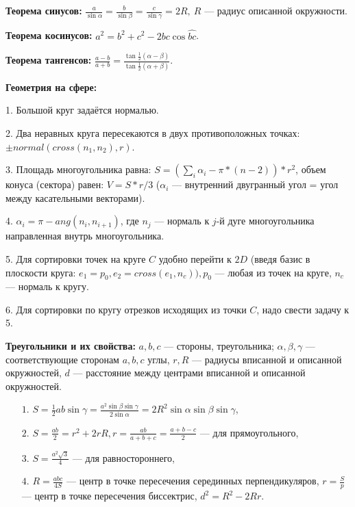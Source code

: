 \textbf{Теорема синусов:} $\frac{a}{\sin\alpha}=\frac{b}{\sin\beta}=\frac{c}{\sin\gamma}=2R,\ R$ --- радиус описанной окружности.

\textbf{Теорема косинусов:} $\displaystyle a^2 = b^2 + c^2 - 2bc\cos{\widehat{bc}}$.

\textbf{Теорема тангенсов:} $\displaystyle \frac{a-b}{a+b}=\frac{\tan\frac{1}{2}(\alpha -\beta)}{\tan\frac{1}{2}(\alpha +\beta)}$.

\textbf{Геометрия на сфере:}

1. Большой круг задаётся нормалью.

2. Два неравных круга пересекаются в двух противоположных точках: $\pm normal(cross(n_1, n_2), r)$.

3. Площадь многоугольника равна: $S = (\sum\limits_i\alpha_i - \pi * (n - 2)) * r^2$,
объем конуса (сектора) равен: $V = S * r / 3$ ($\alpha_i$ --- внутренний двугранный угол = угол между касательными векторами).

4. $\alpha_i = \pi - ang(n_i, n_{i + 1})$, где $n_j$ --- нормаль к $j$-й дуге многоугольника направленная внутрь многоугольника.

5. Для сортировки точек на круге $C$ удобно перейти к $2D$ (введя базис в плоскости круга:
$e_1 = p_0, e_2 = cross(e_1, n_c)), p_0$ --- любая из точек на круге, $n_c$ --- нормаль к кругу.

6. Для сортировки по кругу отрезков исходящих из точки $C$, надо свести задачу к 5.

\textbf{Треугольники и их свойства:}
$a, b, c$ --- стороны, треугольника;
$\alpha, \beta, \gamma$ --- соответствующие сторонам $a, b, c$ углы,
$r, R$ --- радиусы вписанной и описанной окружностей,
$d$ --- расстояние между центрами вписанной и описанной окружностей.

\begin{itemize}
    \item[$1.$] $S=\frac{1}{2}ab\sin\gamma=\frac{a^2\sin \beta\sin \gamma}{2\sin\alpha}=2R^2\sin\alpha\sin\beta\sin\gamma$,
	\item[$2.$] $S=\frac{ab}{2}=r^2+2rR, r = \frac{ab}{a + b + c} = \frac{a + b - c}2$ --- для прямоугольного,
	\item[$3.$] $S=\frac{a^2\sqrt 3}{4}$ --- для равностороннего,
    \item[$4.$] $R=\frac{abc}{4S}$ --- центр в точке пересечения серединных перпендикуляров,
	$r=\frac Sp$ --- центр в точке пересечения биссектрис, $d^2=R^2-2Rr$.
\end{itemize}

